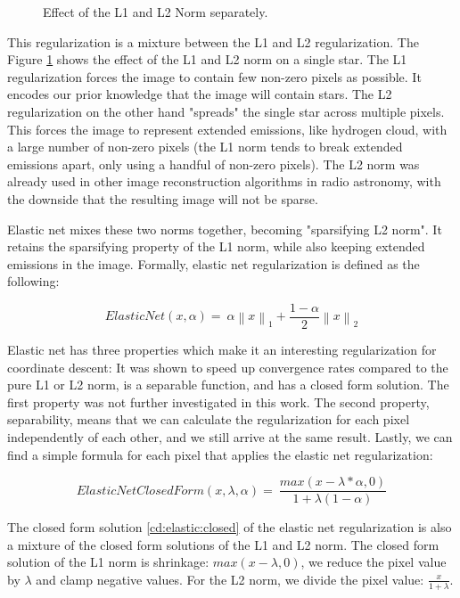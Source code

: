 \begin{figure}[h]
	\caption{Effect of the L1 and L2 Norm separately.}
	\label{cd:elastic}
\end{figure}


This regularization is a mixture between the L1 and L2 regularization. The Figure \ref{cd:elastic} shows the effect of the L1 and L2 norm on a single star. The L1 regularization forces the image to contain few non-zero pixels as possible. It encodes our prior knowledge that the image will contain stars. The L2 regularization on the other hand "spreads" the single star across multiple pixels. This forces the image to represent extended emissions, like hydrogen cloud, with a large number of non-zero pixels (the L1 norm tends to break extended emissions apart, only using a handful of non-zero pixels). The L2 norm was already used in other image reconstruction algorithms in radio astronomy\cite{ferrari2014distributed}, with the downside that the resulting image will not be sparse.

Elastic net mixes these two norms together, becoming "sparsifying L2 norm". It retains the sparsifying property of the L1 norm, while also keeping extended emissions in the image. Formally, elastic net regularization is defined as the following:

\begin{equation}\label{cd:elastic:formula}
ElasticNet(x, \alpha) = \: \alpha \left \|x \right \|_1 + \frac{1-\alpha}{2}  \left \|x \right \|_2
\end{equation}

Elastic net has three properties which make it an interesting regularization for coordinate descent: It was shown to speed up convergence rates compared to the pure L1 or L2 norm\cite{friedman2010regularization}, is a separable function, and has a closed form solution. The first property was not further investigated in this work. The second property, separability, means that we can calculate the regularization for each pixel independently of each other, and we still arrive at the same result. Lastly, we can find a simple formula for each pixel that applies the elastic net regularization:

\begin{equation}\label{cd:elastic:closed}
ElasticNetClosedForm(x, \lambda ,\alpha) = \: \frac{max(x - \lambda * \alpha, 0)}{1+\lambda(1 - \alpha)}
\end{equation}

The closed form solution \eqref{cd:elastic:closed} of the elastic net regularization is also a mixture of the closed form solutions of the L1 and L2 norm. The closed form solution of the L1 norm is shrinkage: $max(x - \lambda, 0)$, we reduce the pixel value by $\lambda$ and clamp negative values. For the L2 norm, we divide the pixel value: $\frac{x}{1+\lambda}$.

